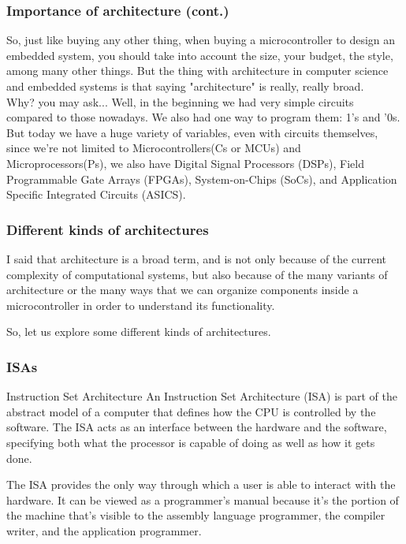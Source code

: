 \documentclass[aspectratio=169]{beamer}
\begin{document}
\begin{frame}
  \frametitle{Importance of architecture (cont.)}
  So, just like buying any other thing, when buying a microcontroller to design an embedded system, you should take into account the size, your budget, the style, among many other things. But the thing with architecture in computer science and embedded systems is that saying "architecture" is really, really broad. \pause \\[5mm]
  Why? you may ask... Well, in the beginning we had very simple circuits compared to those nowadays. We also had one way to program them: 1's and '0s. But today we have a huge variety of variables, even with circuits themselves, since we're not limited to Microcontrollers(\textmu Cs or MCUs) and Microprocessors(\textmu Ps), we also have Digital Signal Processors (DSPs), Field Programmable Gate Arrays (FPGAs), System-on-Chips (SoCs), and Application Specific Integrated Circuits (ASICS).  
\end{frame}

\begin{frame}
  \frametitle{Different kinds of architectures}
  I said that architecture is a broad term, and is not only because of the current complexity of computational systems, but also because of the many variants of architecture or the many ways that we can organize components inside a microcontroller in order to understand its functionality. \pause

  So, let us explore some different kinds of architectures.
\end{frame}

\begin{frame}
  \frametitle{ISAs}
    \begin{block}{Instruction Set Architecture}
      An Instruction Set Architecture (ISA) is part of the abstract model of a computer that defines how the CPU is controlled by the software. The ISA acts as an interface between the hardware and the software, specifying both what the processor is capable of doing as well as how it gets done. \cite{ISA} \pause
    \end{block} 
    The ISA provides the only way through which a user is able to interact with the hardware. It can be viewed as a programmer's manual because it's the portion of the machine that's visible to the assembly language programmer, the compiler writer, and the application programmer. 
  \end{frame}
\end{document}
